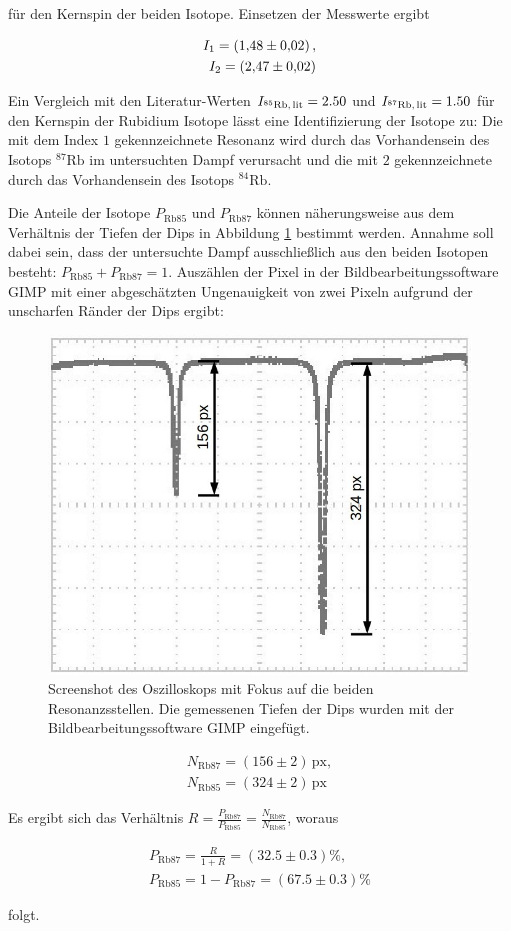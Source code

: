 für den Kernspin der beiden Isotope. Einsetzen der Messwerte ergibt

\begin{eqnarray}
	I_1 = \SI{1.48 \pm 0.02},\\
	I_2 = \SI{2.47 \pm 0.02}.
\end{eqnarray}

Ein Vergleich mit den Literatur-Werten $I_{{}^{85}\text{Rb,\,lit}} = 2.50$ und $I_{{}^{87}\text{Rb,\,lit}} = 1.50$ \cite{Rb} für den Kernspin der Rubidium Isotope lässt eine Identifizierung der Isotope zu: Die mit dem Index $1$ gekennzeichnete Resonanz wird durch das Vorhandensein des Isotops ${}^{87}\text{Rb}$ im untersuchten Dampf verursacht und die mit $2$ gekennzeichnete durch das Vorhandensein des Isotops ${}^{84}\text{Rb}$.

Die Anteile der Isotope $P_{\text{Rb}85}$ und $P_{\text{Rb}87}$ können näherungsweise aus dem Verhältnis der Tiefen der Dips in Abbildung \ref{fig:oszi2_3} bestimmt werden. Annahme soll dabei sein, dass der untersuchte Dampf ausschließlich aus den beiden Isotopen besteht: $P_{\text{Rb}85} + P_{\text{Rb}87} = 1$. Auszählen der Pixel in der Bildbearbeitungssoftware GIMP \cite{Gimp} mit einer abgeschätzten Ungenauigkeit von zwei Pixeln aufgrund der unscharfen Ränder der Dips ergibt:


\begin{figure}
	\centering
	\includegraphics[width=0.7\linewidth]{img/oszi2_3}
	\caption{Screenshot des Oszilloskops mit Fokus auf die beiden Resonanzsstellen. Die gemessenen Tiefen der Dips wurden mit der Bildbearbeitungssoftware GIMP eingefügt.}
	\label{fig:oszi2_3}
\end{figure}

\begin{eqnarray}
	N_{\text{Rb}87} = (156 \pm 2)\, \text{px},\\
	N_{\text{Rb}85} = (324 \pm 2)\, \text{px}
\end{eqnarray}

Es ergibt sich das Verhältnis $R = \frac{P_{\text{Rb}87}}{P_{\text{Rb}85}} = \frac{N_{\text{Rb}87}}{N_{\text{Rb}85}}$, woraus

\begin{eqnarray}
	P_{\text{Rb}87} = \frac{R}{1 + R} = (32.5 \pm 0.3) \%, \\
	P_{\text{Rb}85} = 1 - P_{\text{Rb}87} = (67.5 \pm 0.3) \%
\end{eqnarray}

folgt.